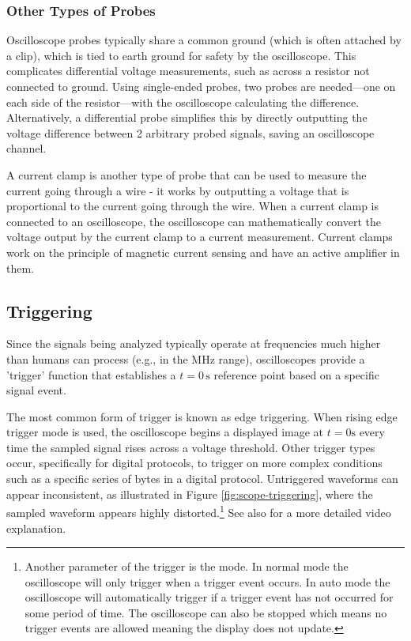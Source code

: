 \documentclass[main.tex]{subfiles}
\begin{document}
\subsubsection{Other Types of Probes}
Oscilloscope probes typically share a common ground (which is often attached by a clip), which is tied to earth ground for safety by the oscilloscope. This complicates differential voltage measurements, such as across a resistor not connected to ground. Using single-ended probes, two probes are needed—one on each side of the resistor—with the oscilloscope calculating the difference. Alternatively, a differential probe simplifies this by directly outputting the voltage difference between 2 arbitrary probed signals, saving an oscilloscope channel. \newline 

\newnoindentpara A current clamp is another type of probe that can be used to measure the current going through a wire - it works by outputting a voltage that is proportional to the current going through the wire. When a current clamp is connected to an oscilloscope, the oscilloscope can mathematically convert the voltage output by the current clamp to a current measurement. Current clamps work on the principle of magnetic current sensing and have an active amplifier in them.


\subsection{Triggering}
Since the signals being analyzed typically operate at frequencies much higher than humans can process (e.g., in the MHz range), oscilloscopes provide a 'trigger' function that establishes a \( t = 0 \, \text{s} \) reference point based on a specific signal event. \newline

\newnoindentpara The most common form of trigger is known as edge triggering. When rising edge trigger mode is used, the oscilloscope begins a displayed image at $t=0 \text{s}$ every time the sampled signal rises across a voltage threshold. Other trigger types occur, specifically for digital protocols, to trigger on more complex conditions such as a specific series of bytes in a digital protocol. Untriggered waveforms can appear inconsistent, as illustrated in Figure \ref{fig:scope-triggering}, where the sampled waveform appears highly distorted.\footnote{Another parameter of the trigger is the mode. In normal mode the oscilloscope will only trigger when a trigger event occurs. In auto mode the oscilloscope will automatically trigger if a trigger event has not occurred for some period of time. The oscilloscope can also be stopped which means no trigger events are allowed meaning the display does not update.} See also  for a more detailed video explanation. 
\end{document}
